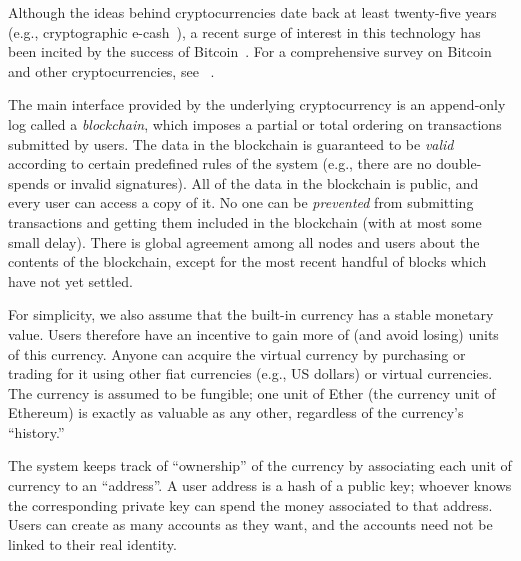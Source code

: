 \documentclass{llncs}
\newcommand{\ignore}[1]{}
\begin{document}
Although the ideas behind cryptocurrencies date back at least twenty-five years (e.g., cryptographic e-cash~\cite{chaum-ecash}), a recent surge of interest in this technology has been incited by the success of Bitcoin~\cite{bitcoin}. For a comprehensive survey on Bitcoin and other cryptocurrencies, see ~\cite{researchperspectives,bittertobetter}.

\ignore{We shall make some simplifying assumptions 
about the security model of the underlying cryptocurrency.
Loosely speaking, we assume that the
cryptocurrency has a secure and incentive compatible
consensus protocol. 
In reality, existing decentralized cryptocurrencies
achieve only heuristic security; designing a provably  
secure decentralized consensus protocol under
rationality assumptions is a topic of 
future research.
}

The main interface provided by the underlying cryptocurrency is an append-only log called a \emph{blockchain}, which imposes a partial or total ordering on transactions submitted by users. The data in the blockchain is guaranteed to be \emph{valid} according to certain predefined rules of the system (e.g., there are no double-spends or invalid signatures). All of the data in the blockchain is public, and every user can access a copy of it. No one can be \emph{prevented} from submitting transactions and getting them included in the blockchain (with at most some small delay). There is global agreement among all nodes and users about the contents of the blockchain,  except for the most recent handful of blocks which have not yet settled.

For simplicity, we also assume that the built-in currency has a stable monetary value. Users therefore have an incentive to gain more of (and avoid losing) units of this currency. Anyone can acquire 
the virtual currency by purchasing or trading for it using 
other fiat currencies (e.g., US dollars) or virtual currencies. The currency is assumed to be fungible; one unit of Ether (the currency unit of Ethereum) is exactly as valuable as any other, regardless of the currency's ``history.''

The system keeps track of ``ownership'' of the currency by associating each unit of currency to an ``address''. 
A user address is a hash of a public key; whoever knows the corresponding private key can spend the money associated to that address. Users can create as many accounts as they want, and the accounts need not be linked to their real identity.
\end{document}

